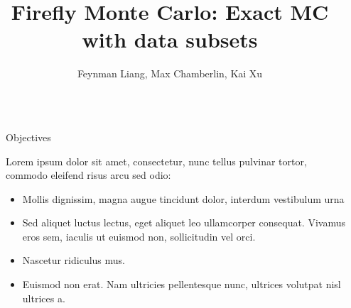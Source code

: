\documentclass[final]{beamer}
\title{Firefly Monte Carlo: Exact MC with data subsets} %
\author{Feynman Liang, Max Chamberlin, Kai Xu} %
\institute{Cambridge University Engineering Department} %
\newlength{\sepwid}
\newlength{\onecolwid}
\begin{document}

\setlength{\belowcaptionskip}{2ex} %
\setlength\belowdisplayshortskip{2ex} %

\begin{frame}[t] %

\begin{columns}[t] %

\begin{column}{\sepwid}\end{column} %

\begin{column}{\onecolwid} %


\begin{alertblock}{Objectives}

Lorem ipsum dolor sit amet, consectetur, nunc tellus pulvinar tortor, commodo eleifend risus arcu sed odio:
\begin{itemize}
\item Mollis dignissim, magna augue tincidunt dolor, interdum vestibulum urna
\item Sed aliquet luctus lectus, eget aliquet leo ullamcorper consequat. Vivamus eros sem, iaculis ut euismod non, sollicitudin vel orci.
\item Nascetur ridiculus mus.
\item Euismod non erat. Nam ultricies pellentesque nunc, ultrices volutpat nisl ultrices a.
\end{itemize}

\end{alertblock}



\end{column}
\end{columns}
\end{frame}
\end{document}
